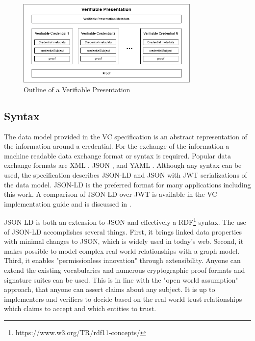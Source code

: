 \begin{figure}[htbp]
  \centering
  \includegraphics[width=0.8\textwidth]{figures/presentation.png}
  \caption{Outline of a Verifiable Presentation} \label{fig:presentation}
\end{figure}

\subsection{Syntax}

The data model provided in the \acrshort{VC} specification is an abstract representation of the information around a credential. For the exchange of the information a machine readable data exchange format or syntax is required. Popular data exchange formats are XML \parencite{xmlRFC}, \acrshort{JSON} \parencite{jsonRFC}, and \acrshort{YAML} \parencite{yaml}. Although any syntax can be used, the specification describes \acrfull{JSON-LD} \parencite{jsonld} and \acrshort{JSON} with \acrshort{JWT} \parencite{rfc7519} serializations of the data model. \acrshort{JSON-LD} is the preferred format for many applications including this work. A comparison of \acrshort{JSON-LD} over \acrshort{JWT} is available in the \acrshort{VC} implementation guide \parencite{chadwick_longley_sporny_terbu_zagidulin_zundel_2019} and is discussed in \cite{young_2021}. 

\acrshort{JSON-LD} is both an extension to \acrshort{JSON} and effectively a \acrfull{RDF}\footnote{https://www.w3.org/TR/rdf11-concepts/} syntax. The use of \acrshort{JSON-LD} accomplishes several things. First, it  brings linked data properties with minimal changes to \acrshort{JSON}, which is widely used in today's web. Second, it makes possible to model complex real world relationships with a graph model. Third, it enables "permissionless innovation" through extensibility. Anyone can extend the existing vocabularies and numerous cryptographic proof formats and signature suites can be used. This is in line with the "open world assumption" approach, that anyone can assert claims about any subject. It is up to implementers and verifiers to decide based on the real world trust relationships which claims to accept and which entities to trust. 

